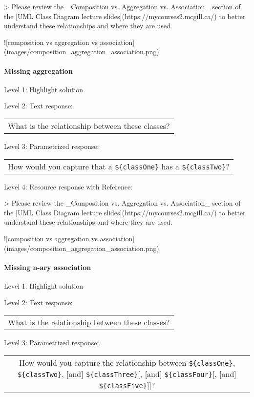 > Please review the _Composition vs. Aggregation vs. Association_ section of 
the [UML Class Diagram lecture slides](https://mycourses2.mcgill.ca/) to 
better understand these relationships and where they are used.

![composition vs aggregation vs association](images/composition_aggregation_association.png)


\paragraph{Missing aggregation}

\noindent Level 1: Highlight solution \medskip

\noindent Level 2: Text response: \medskip

\begin{tabular}{|c}
What is the relationship between these classes?
\end{tabular} \medskip

\noindent Level 3: Parametrized response: \medskip

\begin{tabular}{|c}
How would you capture that a \verb|${classOne}| has a \verb|${classTwo}|?
\end{tabular} \medskip

\noindent Level 4: Resource response with Reference:

> Please review the _Composition vs. Aggregation vs. Association_ section of 
the [UML Class Diagram lecture slides](https://mycourses2.mcgill.ca/) to 
better understand these relationships and where they are used.

![composition vs aggregation vs association](images/composition_aggregation_association.png)


\paragraph{Missing n-ary association}

\noindent Level 1: Highlight solution \medskip

\noindent Level 2: Text response: \medskip

\begin{tabular}{|c}
What is the relationship between these classes?
\end{tabular} \medskip

\noindent Level 3: Parametrized response: \medskip

\begin{tabular}{|c}
How would you capture the relationship between \verb|${classOne}|, \verb|${classTwo}|, [and] \verb|${classThree}|[, [and] \verb|${classFour}|[, [and] \verb|${classFive}|]]?
\end{tabular} \medskip

